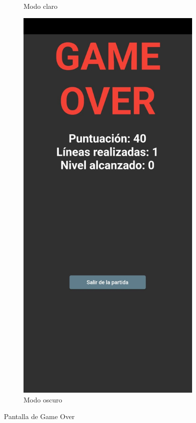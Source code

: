 \documentclass{article}
\begin{document}
\begin{figure}[H]
\begin{subfigure}{0.5\textwidth}
          \caption{Modo claro}
  \end{subfigure}
  \begin{subfigure}{0.5\textwidth}
          \includegraphics[width=\textwidth]{imagenes/captura4dark.jpeg}
          \caption{Modo oscuro}
  \end{subfigure}
  \caption{Pantalla de Game Over}
\end{figure}
\end{document}
